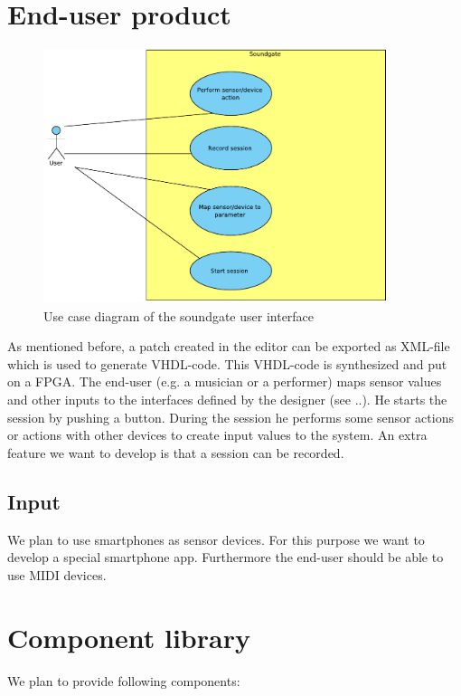 \section{End-user product}

	\begin{figure}[!h]
		\centering
			\includegraphics[width=0.90\textwidth]{images/User_View.pdf}
		\caption{Use case diagram of the soundgate user interface}
		\label{fig:Soundgate_UserInterface}
	\end{figure}
	
	As mentioned before, a patch created in the editor can be exported as XML-file which is used to generate VHDL-code. This VHDL-code is synthesized and put on a FPGA. The end-user (e.g. a musician or a performer) maps sensor values and other inputs to the interfaces defined by the designer (see ..). He starts the session by pushing a button. During the session he performs some sensor actions or actions with other devices to create input values to the system. An extra feature we want to develop is that a session can be recorded.
	
\subsection{Input}
We plan to use smartphones as sensor devices. For this purpose we want to develop a special smartphone app. Furthermore the end-user should be able to use MIDI devices.

\section{Component library}
We plan to provide following components:


